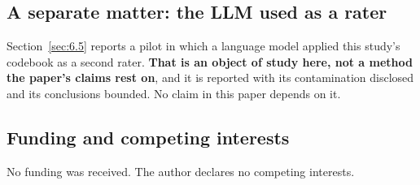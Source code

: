 \documentclass[11pt,a4paper]{article}
\begin{document}
\subsection{A separate matter: the LLM used as a rater}
\label{sec:8.4}

Section~\ref{sec:6.5} reports a pilot in which a language model applied this study's codebook as a second rater. \textbf{That is an object of study here, not a method the paper's claims rest on}, and it is reported with its contamination disclosed and its conclusions bounded. No claim in this paper depends on it.

\subsection{Funding and competing interests}
\label{sec:8.5}

No funding was received. The author declares no competing interests.


\clearpage
\end{document}
